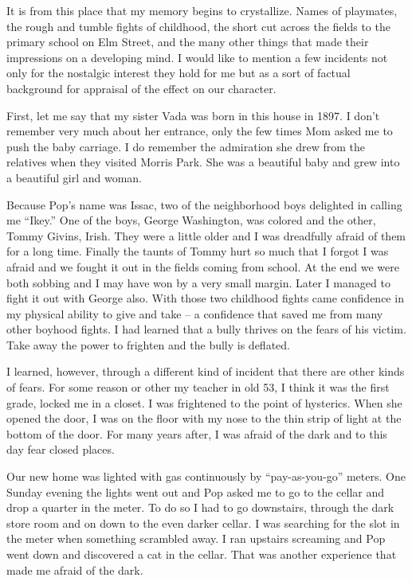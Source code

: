 \documentclass[12pt]{book}              %
\begin{document}
It is from this place that my memory begins to crystallize. Names of playmates, the rough and tumble fights of childhood, the short cut across the fields to the primary school on Elm Street, and the many other things that made their impressions on a developing mind. I would like to mention a few incidents not only for the nostalgic interest they hold for me but as a sort of factual background for appraisal of the effect on our character. 

First, let me say that my sister Vada was born in this house in 1897. I don't remember very much about her entrance, only the few times Mom asked me to push the baby carriage. I do remember the admiration she drew from the relatives when they visited Morris Park. She was a beautiful baby and grew into a beautiful girl and woman.

Because Pop's name was Issac, two of the neighborhood boys delighted in calling me ``Ikey.'' One of the boys, George Washington, was colored and the other, Tommy Givins, Irish. They were a little older and I was dreadfully afraid of them for a long time. Finally the taunts of Tommy hurt so much that I forgot I was afraid and we fought it out in the fields coming from school. At the end we were both sobbing and I may have won by a very small margin. Later I managed to fight it out with George also. With those two childhood fights came confidence in my physical ability to give and take -- a confidence that saved me from many other boyhood fights. I had learned that a bully thrives on the fears of his victim. Take away the power to frighten and the bully is deflated. 

I learned, however, through a different kind of incident that there are other kinds of fears. For some reason or other my teacher in old 53, I think it was the first grade, locked me in a closet. I was frightened to the point of hysterics. When she opened the door, I was on the floor with my nose to the thin strip of light at the bottom of the door. For many years after, I was afraid of the dark and to this day fear closed places. 

Our new home was lighted with gas continuously by ``pay-as-you-go'' meters. One Sunday evening the lights went out and Pop asked me to go to the cellar and drop a quarter in the meter. To do so I had to go downstairs, through the dark store room and on down to the even darker cellar. I was searching for the slot in the meter when something scrambled away. I ran upstairs screaming and Pop went down and discovered a cat in the cellar. That was another experience that made me afraid of the dark.
\end{document}
